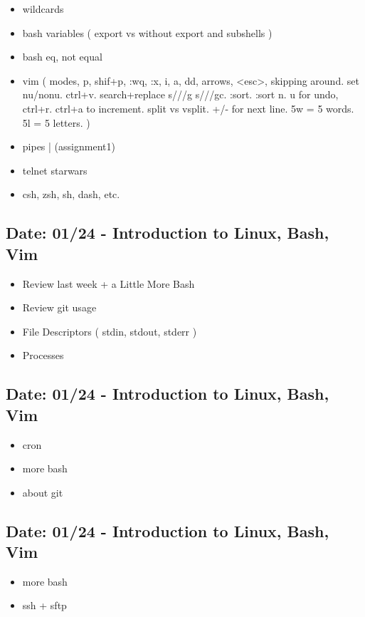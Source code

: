 \documentclass[11pt]{article}
\begin{document}
\begin{itemize}
\begin{multicols}{2}
\begin{enumerate}
\end{enumerate}
\end{multicols}
\item wildcards
\item bash variables ( export vs without export and subshells )
\item bash eq, not equal
\item vim ( modes, p, shif+p, :wq, :x, i, a, dd, arrows, <esc>, skipping around. set nu/nonu. ctrl+v. search+replace s///g s///gc. :sort. :sort n. u for undo, ctrl+r. ctrl+a to increment. split vs vsplit. +/- for next line. 5w = 5 words. 5l = 5 letters. )
\item pipes | (assignment1)
\item telnet starwars
\item csh, zsh, sh, dash, etc.
\end{itemize}

\subsection*{Date: 01/24 - Introduction to Linux, Bash, Vim }
\begin{itemize}
	\item Review last week + a Little More Bash
	\item Review git usage
	\item File Descriptors ( stdin, stdout, stderr )
	\item Processes
\end{itemize}

\subsection*{Date: 01/24 - Introduction to Linux, Bash, Vim }
\begin{itemize}
	\item cron
	\item more bash
	\item about git
\end{itemize}


\subsection*{Date: 01/24 - Introduction to Linux, Bash, Vim }
\begin{itemize}
	\item more bash
	\item ssh + sftp
\end{itemize}
\end{document}

